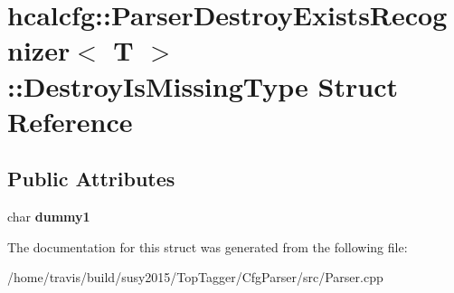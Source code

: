 \hypertarget{structhcalcfg_1_1ParserDestroyExistsRecognizer_1_1DestroyIsMissingType}{\section{hcalcfg\-:\-:Parser\-Destroy\-Exists\-Recognizer$<$ T $>$\-:\-:Destroy\-Is\-Missing\-Type Struct Reference}
\label{structhcalcfg_1_1ParserDestroyExistsRecognizer_1_1DestroyIsMissingType}
}
\subsection*{Public Attributes}
\begin{DoxyCompactItemize}
\item 
\hypertarget{structhcalcfg_1_1ParserDestroyExistsRecognizer_1_1DestroyIsMissingType_a348be875a5ce8f5fd270f5d94a472e1f}{char {\bfseries dummy1}}\label{structhcalcfg_1_1ParserDestroyExistsRecognizer_1_1DestroyIsMissingType_a348be875a5ce8f5fd270f5d94a472e1f}

\end{DoxyCompactItemize}


The documentation for this struct was generated from the following file\-:\begin{DoxyCompactItemize}
\item 
/home/travis/build/susy2015/\-Top\-Tagger/\-Cfg\-Parser/src/Parser.\-cpp\end{DoxyCompactItemize}
